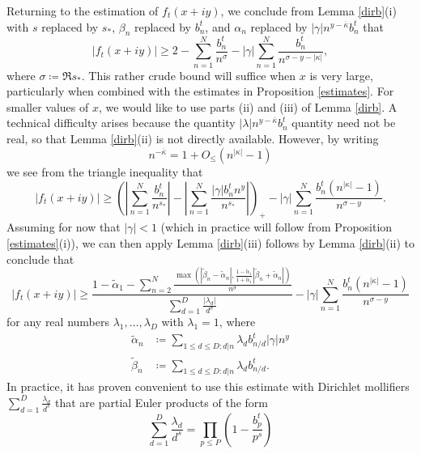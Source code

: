 Returning to the estimation of $f_t(x+iy)$, we conclude from Lemma \ref{dirb}(i) with $s$ replaced by $s_*$, $\beta_n$ replaced by $b_n^t$, and $\alpha_n$ replaced by $|\gamma| n^{y-\overline{\kappa}} b_n^t$ that
\begin{equation}\label{x-init}
|f_t(x+iy)| \geq 2 - \sum_{n=1}^N \frac{b_n^t}{n^\sigma} - |\gamma| \sum_{n=1}^N \frac{b_n^t}{n^{\sigma-y-|\kappa|}},
\end{equation}
where $\sigma \coloneqq \Re s_*$.  This rather crude bound will suffice when $x$ is very large, particularly when combined with the estimates in Proposition \ref{estimates}.   For smaller values of $x$, we would like to use parts (ii) and (iii) of Lemma \ref{dirb}.  A technical difficulty arises because the quantity $|\lambda| n^{y-\overline{\kappa}} b_n^t$ quantity need not be real, so that Lemma \ref{dirb}(ii) is not directly available.  However, by writing
$$ n^{-\overline{\kappa}} = 1 + O_{\leq}( n^{|\kappa|} - 1 )$$
we see from the triangle inequality that
$$ |f_t(x+iy)| \geq \left( \left| \sum_{n=1}^N \frac{b_n^t}{n^{s_*}}\right| - \left| \sum_{n=1}^N \frac{|\gamma| b_n^t n^y}{n^{s_*}}\right| \right)_+
- |\gamma| \sum_{n=1}^N \frac{b_n^t (n^{|\kappa|} - 1)}{n^{\sigma-y}}.$$
Assuming for now that $|\gamma| < 1$ (which in practice will follow from Proposition \ref{estimates}(i)), we can then apply Lemma \ref{dirb}(iii) follows by Lemma \ref{dirb}(ii) to conclude that
\begin{equation}\label{x-adv}
|f_t(x+iy)| \geq \frac{1 - \tilde \alpha_1 - \sum_{n=2}^N \frac{\max( |\tilde \beta_n-\tilde \alpha_n|, \frac{1-\tilde \alpha_1}{1+\tilde \alpha_1} |\tilde \beta_n+\tilde \alpha_n|)}{n^\sigma}}{\sum_{d=1}^D \frac{|\lambda_d|}{d^\sigma}} - |\gamma| \sum_{n=1}^N \frac{b_n^t (n^{|\kappa|} - 1)}{n^{\sigma-y}}
\end{equation}
for any real numbers $\lambda_1,\dots,\lambda_D$ with $\lambda_1 = 1$, where
\begin{align*}
\tilde \alpha_n &\coloneqq \sum_{1 \leq d \leq D: d|n} \lambda_d b_{n/d}^t |\gamma| n^y \\
\tilde \beta_n &\coloneqq \sum_{1 \leq d \leq D: d|n} \lambda_d b_{n/d}^t.
\end{align*}
In practice, it has proven convenient to use this estimate with Dirichlet mollifiers $\sum_{d=1}^D \frac{\lambda_d}{d^s}$ that are partial Euler products of the form
\begin{equation}\label{ld}
 \sum_{d=1}^D \frac{\lambda_d}{d^s} = \prod_{p \leq P} \left( 1 - \frac{b_p^t}{p^s} \right)
\end{equation}
